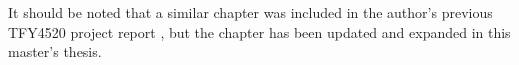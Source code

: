 It should be noted that a similar chapter was included in the author's previous TFY4520 project report \cite{project_report}, but the chapter has been updated and expanded in this master's thesis.